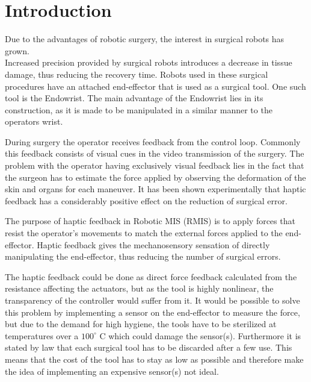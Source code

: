 \section{Introduction}
Due to the advantages of robotic surgery, the interest in surgical robots has grown\cite{forbes}.\\
Increased precision provided by surgical robots introduces a decrease in tissue damage, thus reducing the recovery time\cite{RIGSP}.
Robots used in these surgical procedures have an attached end-effector that is used as a surgical tool.
One such tool is the Endowrist.
The main advantage of the Endowrist lies in its construction, as it is made to be manipulated in a similar manner to the operators wrist.

During surgery the operator receives feedback from the control loop. Commonly this feedback consists of visual cues in the video transmission of the surgery.
The problem with the operator having exclusively visual feedback lies in the fact that the surgeon has to estimate the force applied by observing the deformation of the skin and organs for each maneuver. 
It has been shown experimentally that haptic feedback has a considerably positive effect on the reduction of surgical error\cite{EOFGFF}.

The purpose of haptic feedback in Robotic MIS (RMIS) is to apply forces that resist the operator’s movements to match the external forces applied to the end-effector.
Haptic feedback gives the mechanosensory sensation of directly manipulating the end-effector, thus reducing the number of surgical errors.

The haptic feedback could be done as direct force feedback calculated from the resistance affecting the actuators, but as the tool is highly nonlinear, the transparency of the controller would suffer from it.  It would be possible to solve this problem by implementing a sensor on the end-effector to measure the force, but due to the demand for high hygiene, the tools have to be sterilized at temperatures over a $100^\circ$ C which could damage the sensor(s). Furthermore it is stated by law that each surgical tool has to be discarded after a few use. This means that the cost of the tool has to stay as low as possible and therefore make the idea of implementing an expensive sensor(s) not ideal.

